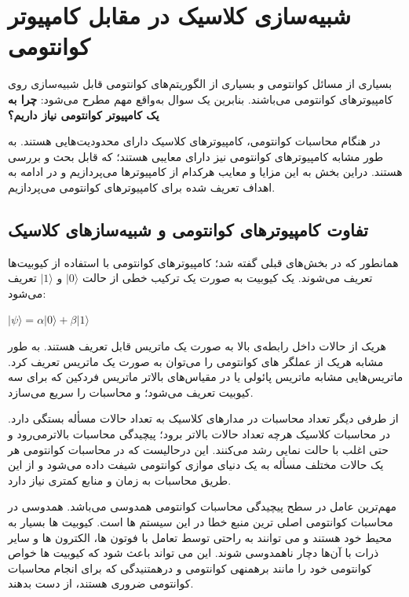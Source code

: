 \documentclass{book}
\begin{document}
\section{شبیه‌سازی کلاسیک در مقابل کامپیوتر کوانتومی}

بسیاری از مسائل کوانتومی و بسیاری از الگوریتم‌های کوانتومی قابل شبیه‌سازی روی کامپیوتر‌های کوانتومی می‌باشند. بنابرین یک سوال به‌واقع مهم مطرح می‌شود: \textbf{چرا به یک کامپیوتر کوانتومی نیاز داریم؟}

در هنگام محاسبات کوانتومی،‌ کامپیوتر‌های کلاسیک دارای محدودیت‌هایی هستند. به طور مشابه کامپیوتر‌های کوانتومی نیز دارای معایبی هستند؛ که قابل بحث و بررسی هستند. دراین بخش به این مزایا و معایب هرکدام از کامپیوترها می‌پردازیم و در ادامه به اهداف تعریف شده برای کامپیوترهای کوانتومی می‌پردازیم.


\subsection{تفاوت کامپیوترهای کوانتومی و شبیه‌سازهای کلاسیک}
همانطور که در بخش‌های قبلی گفته شد؛ کامپیوترهای کوانتومی با استفاده از کیوبیت‌ها تعریف می‌شوند. یک کیوبیت به صورت یک ترکیب خطی از حالت $\vert0\rangle$ و $\vert1\rangle$ تعریف می‌شود:

\begin{center}
	$\vert\psi\rangle = \alpha\vert0\rangle + \beta\vert1\rangle$
\end{center}

هریک از حالات داخل رابطه‌ی بالا به صورت یک ماتریس قابل تعریف هستند. به طور مشابه هریک از عملگر های کوانتومی را می‌توان به صورت یک ماتریس تعریف کرد. ماتریس‌هایی مشابه ماتریس پائولی یا در مقیاس‌های بالاتر ماتریس فردکین که برای سه کیوبیت تعریف می‌شود؛ و محاسبات را سریع می‌سازد.



از طرفی دیگر تعداد محاسبات در مدار‌های کلاسیک به تعداد حالات مسأله بستگی دارد. در محاسبات کلاسیک هرچه تعداد حالات بالاتر برود؛ پیچیدگی محاسبات بالاتر‌می‌رود و حتی اغلب با حالت نمایی رشد می‌کنند. این درحالیست که در محاسبات کوانتومی هر یک حالات مختلف مسأله به یک دنیای موازی کوانتومی شیفت داده می‌شود و از این طریق محاسبات به زمان و منابع کمتری نیاز دارد.


مهم‌ترین عامل در سطح پیچیدگی محاسبات کوانتومی همدوسی می‌باشد. 
همدوسی در محاسبات کوانتومی اصلی ترین منبع خطا در این سیستم ها است. کیوبیت ها بسیار به محیط خود هستند و می توانند به راحتی توسط  تعامل با فوتون ها، الکترون ها و سایر ذرات با آن‌ها دچار ناهمدوسی شوند. این می تواند باعث شود که کیوبیت ها خواص کوانتومی خود را مانند برهمنهی کوانتومی و درهمتنیدگی که برای انجام محاسبات کوانتومی ضروری هستند، از دست بدهند.
\end{document}
